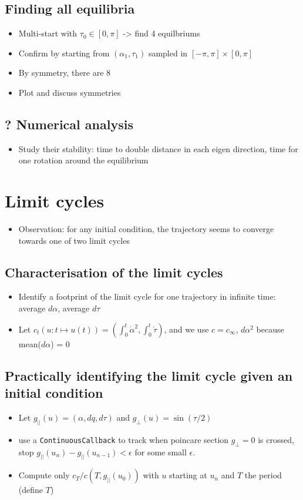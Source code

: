 \subsection{Finding all equilibria}
\begin{itemize}
 \item Multi-start with $\tau_0 \in [0, \pi]$ -> find 4 equilbriums
 \item Confirm by starting from $(\alpha_1, \tau_1)$ sampled in $[-\pi, \pi] \times [0, \pi]$
 \item By symmetry, there are 8
 \item Plot and discuss symmetries
\end{itemize}

\subsection{? Numerical analysis}
\begin{itemize}
 \item Study their stability: time to double distance in each eigen direction, time for one rotation around the equilibrium
\end{itemize}

\section{Limit cycles}
\begin{itemize}
 \item Observation: for any initial condition, the trajectory seems to converge towards one of two limit cycles
\end{itemize}

\subsection{Characterisation of the limit cycles}
\begin{itemize}
 \item Identify a footprint of the limit cycle for one trajectory in infinite time: average $d\alpha$, average $d\tau$
 \item Let $c_t(u : t \mapsto u(t)) = \left(\int_0^t \dot \alpha^2, \int_0^t \dot \tau\right)$, and we use $c = c_\infty$, $d\alpha^2$ because mean($d\alpha$) = 0
\end{itemize}

\subsection{Practically identifying the limit cycle given an initial condition}
\begin{itemize}
 \item Let $g_{||}(u) = (\alpha, dq, d\tau)$ and $g_\perp(u) = \sin(\tau / 2)$
 \item use a \texttt{ContinuousCallback} to track when poincare section $g_\perp = 0$ is crossed, stop $g_{||}(u_n) - g_{||}(u_{n-1}) < \epsilon$ for some small $\epsilon$.
 \item Compute only $c_T/c(T, g_{||}(u_0))$ with $u$ starting at $u_n$ and $T$ the period (define $T$)
\end{itemize}

